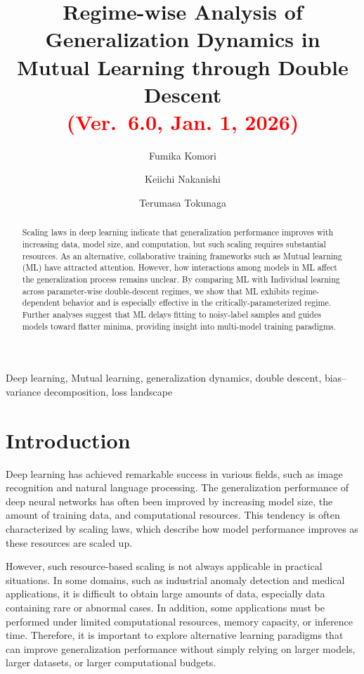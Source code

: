 \documentclass[dvipdfmx]{nolta}        %
\title{Regime-wise Analysis of Generalization Dynamics in Mutual Learning through Double Descent\\
\textcolor{red}{(Ver.\ 6.0, Jan. 1, 2026)}}
\author{Fumika Komori}{1}\orcid{0009-0002-0232-8790},
\author*{Keiichi Nakanishi}{1}\orcid{0009-0005-7638-2679},
\author{Terumasa Tokunaga}{2,3}\orcid{0000-0003-1091-2022}
\begin{document}
\begin{abstract}
Scaling laws in deep learning indicate that generalization performance improves with increasing data, model size, and computation, but such scaling requires substantial resources. As an alternative, collaborative training frameworks such as Mutual learning (ML) have attracted attention. However, how interactions among models in ML affect the generalization process remains unclear. By comparing ML with Individual learning across parameter-wise double-descent regimes, we show that ML exhibits regime-dependent behavior and is especially effective in the critically-parameterized regime. Further analyses suggest that ML delays fitting to noisy-label samples and guides models toward flatter minima, providing insight into multi-model training paradigms.
\end{abstract}

\begin{keywords}
Deep learning, Mutual learning, generalization dynamics, double descent, bias--variance decomposition, loss landscape
\end{keywords}

\maketitle

\section{Introduction}
Deep learning has achieved remarkable success in various fields, such as image recognition and natural language processing. The generalization performance of deep neural networks has often been improved by increasing model size, the amount of training data, and computational resources\cite{kaplan_scaling_2020}. This tendency is often characterized by scaling laws, which describe how model performance improves as these resources are scaled up.

However, such resource-based scaling is not always applicable in practical situations. In some domains, such as industrial anomaly detection and medical applications, it is difficult to obtain large amounts of data, especially data containing rare or abnormal cases. In addition, some applications must be performed under limited computational resources, memory capacity, or inference time. Therefore, it is important to explore alternative learning paradigms that can improve generalization performance without simply relying on larger models, larger datasets, or larger computational budgets.
\end{document}
